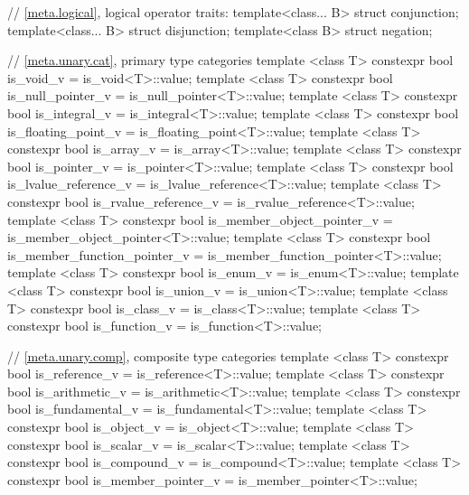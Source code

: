 \begin{codeblock}
{  // \ref{meta.logical}, logical operator traits:
  template<class... B> struct conjunction;
  template<class... B> struct disjunction;
  template<class B> struct negation;

  // \ref{meta.unary.cat}, primary type categories
  template <class T> constexpr bool is_void_v
    = is_void<T>::value;
  template <class T> constexpr bool is_null_pointer_v
    = is_null_pointer<T>::value;
  template <class T> constexpr bool is_integral_v
    = is_integral<T>::value;
  template <class T> constexpr bool is_floating_point_v
    = is_floating_point<T>::value;
  template <class T> constexpr bool is_array_v
    = is_array<T>::value;
  template <class T> constexpr bool is_pointer_v
    = is_pointer<T>::value;
  template <class T> constexpr bool is_lvalue_reference_v
    = is_lvalue_reference<T>::value;
  template <class T> constexpr bool is_rvalue_reference_v
    = is_rvalue_reference<T>::value;
  template <class T> constexpr bool is_member_object_pointer_v
    = is_member_object_pointer<T>::value;
  template <class T> constexpr bool is_member_function_pointer_v
    = is_member_function_pointer<T>::value;
  template <class T> constexpr bool is_enum_v
    = is_enum<T>::value;
  template <class T> constexpr bool is_union_v
    = is_union<T>::value;
  template <class T> constexpr bool is_class_v
    = is_class<T>::value;
  template <class T> constexpr bool is_function_v
    = is_function<T>::value;

  // \ref{meta.unary.comp}, composite type categories
  template <class T> constexpr bool is_reference_v
    = is_reference<T>::value;
  template <class T> constexpr bool is_arithmetic_v
    = is_arithmetic<T>::value;
  template <class T> constexpr bool is_fundamental_v
    = is_fundamental<T>::value;
  template <class T> constexpr bool is_object_v
    = is_object<T>::value;
  template <class T> constexpr bool is_scalar_v
    = is_scalar<T>::value;
  template <class T> constexpr bool is_compound_v
    = is_compound<T>::value;
  template <class T> constexpr bool is_member_pointer_v
    = is_member_pointer<T>::value;

}
\end{codeblock}
